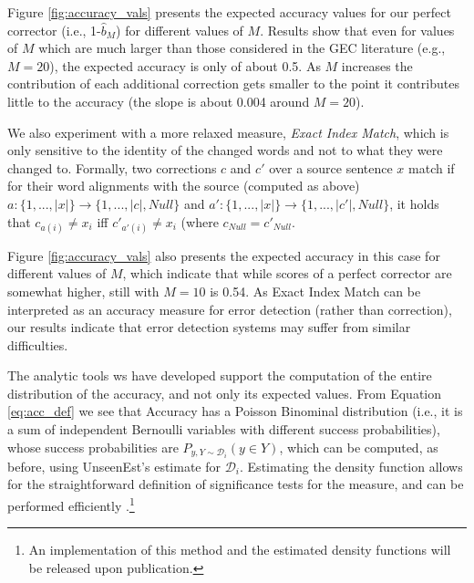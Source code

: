 \documentclass[letter,11pt]{article}
\newcommand{\lc}[1]{\footnote{\color{blue}LC: #1}}
\begin{document}
Figure \ref{fig:accuracy_vals} presents the expected accuracy values for our perfect
corrector (i.e., 1-$\hat{b}_M$) for different values of $M$. 
Results show that even for values of $M$ which are much larger than those considered in the GEC literature (e.g., $M=20$),
the expected accuracy is only of about 0.5. As $M$ increases the contribution of each additional correction
  gets smaller to the point it contributes little to the accuracy (the slope is about 0.004 around $M=20$).

We also experiment with a more relaxed measure, {\it Exact Index Match}, which is only sensitive
to the identity of the changed words and not to what they were changed to. 
Formally, two corrections $c$ and $c'$ over a source sentence $x$ match
if for their word alignments with the source (computed as above) $a:\{1,...,\left|x\right|\} \rightarrow \{1,...,\left|c\right|,Null\}$
and $a':\{1,...,\left|x\right|\} \rightarrow \{1,...,\left|c'\right|,Null\}$, it holds that $c_{a\left(i\right)} \neq x_{i}$ iff $c'_{a'\left(i\right)} \neq x_{i}$ (where $c_{Null}=c'_{Null}$.

Figure \ref{fig:accuracy_vals} also presents the expected accuracy in this case
for different values of $M$, which indicate that while scores of a perfect corrector are somewhat higher,
still with $M=10$ is 0.54.
As Exact Index Match can be interpreted as an accuracy measure for error detection (rather than correction),
our results indicate that error detection systems may suffer from similar difficulties.
%

The analytic tools ws have developed support the computation of the entire distribution of the accuracy,
and not only its expected values. From Equation \ref{eq:acc_def} we see that Accuracy has a Poisson Binominal distribution (i.e., it is a sum of independent Bernoulli variables with different success probabilities), whose success probabilities are $P_{y,Y \sim \mathcal{D}_i}(y \in Y)$, which can be computed, as before, using {\sc UnseenEst}'s estimate for $\mathcal{D}_i$. Estimating the density function allows for the straightforward definition of significance tests for the measure, and can be performed efficiently \cite{hong2013computing}.\footnote{An implementation of this method and the estimated density functions will be released upon publication.}
\end{document}

